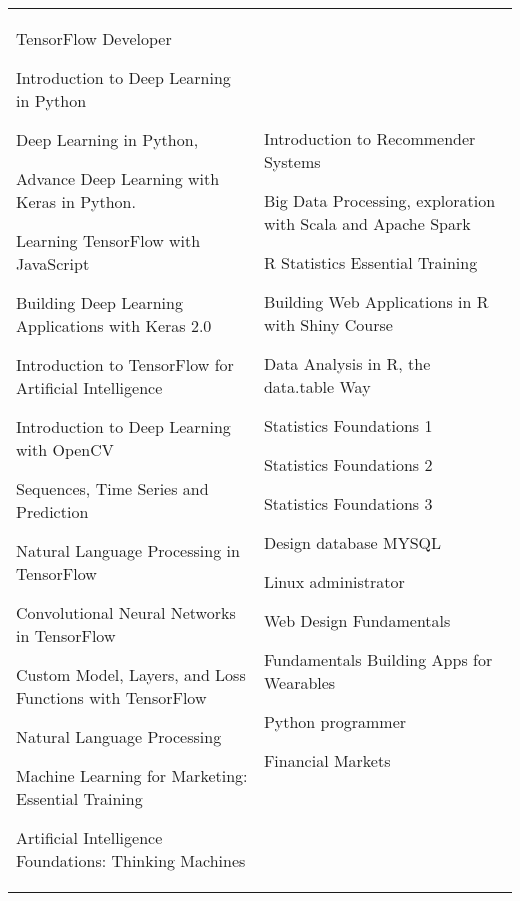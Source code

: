 
\begin{tabularx}{\textwidth}{@{}X X@{}}
TensorFlow Developer \par
Introduction to Deep Learning in Python\par
Deep Learning in Python,\par 
Advance Deep Learning with Keras in Python.\par
Learning TensorFlow with JavaScript\par
Building Deep Learning Applications with Keras 2.0\par
Introduction to TensorFlow for Artificial Intelligence\par
Introduction to Deep Learning with OpenCV\par

Sequences, Time Series and Prediction\par
Natural Language Processing in TensorFlow\par
Convolutional Neural Networks in TensorFlow\par
Custom Model, Layers, and Loss Functions with TensorFlow\par
Natural Language Processing\par

Machine Learning for Marketing: Essential Training\par
Artificial Intelligence Foundations: Thinking Machines\par

&  %
Introduction to Recommender Systems\par
Big Data Processing, exploration with Scala and Apache Spark\par

R Statistics Essential Training\par
Building Web Applications in R with Shiny Course\par
Data Analysis in R, the data.table Way\par

Statistics Foundations 1\par
Statistics Foundations 2\par
Statistics Foundations 3\par
Design database MYSQL\par

Linux administrator\par
Web Design Fundamentals\par
Fundamentals Building Apps for Wearables\par
Python programmer\par
Financial Markets\par
\\
\end{tabularx}